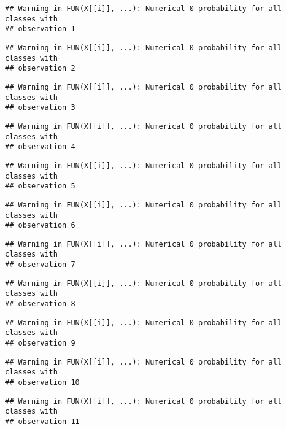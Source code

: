 \documentclass[
]{article}
\begin{document}
\begin{verbatim}
## Warning in FUN(X[[i]], ...): Numerical 0 probability for all classes with
## observation 1
\end{verbatim}

\begin{verbatim}
## Warning in FUN(X[[i]], ...): Numerical 0 probability for all classes with
## observation 2
\end{verbatim}

\begin{verbatim}
## Warning in FUN(X[[i]], ...): Numerical 0 probability for all classes with
## observation 3
\end{verbatim}

\begin{verbatim}
## Warning in FUN(X[[i]], ...): Numerical 0 probability for all classes with
## observation 4
\end{verbatim}

\begin{verbatim}
## Warning in FUN(X[[i]], ...): Numerical 0 probability for all classes with
## observation 5
\end{verbatim}

\begin{verbatim}
## Warning in FUN(X[[i]], ...): Numerical 0 probability for all classes with
## observation 6
\end{verbatim}

\begin{verbatim}
## Warning in FUN(X[[i]], ...): Numerical 0 probability for all classes with
## observation 7
\end{verbatim}

\begin{verbatim}
## Warning in FUN(X[[i]], ...): Numerical 0 probability for all classes with
## observation 8
\end{verbatim}

\begin{verbatim}
## Warning in FUN(X[[i]], ...): Numerical 0 probability for all classes with
## observation 9
\end{verbatim}

\begin{verbatim}
## Warning in FUN(X[[i]], ...): Numerical 0 probability for all classes with
## observation 10
\end{verbatim}

\begin{verbatim}
## Warning in FUN(X[[i]], ...): Numerical 0 probability for all classes with
## observation 11
\end{verbatim}
\end{document}
